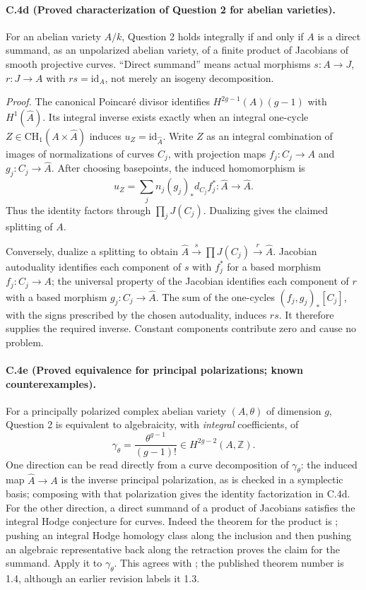 \paragraph{C.4d (Proved characterization of Question 2 for abelian varieties).}
For an abelian variety $A/k$, Question 2 holds integrally if and only
if $A$ is a direct summand, as an unpolarized abelian variety, of a
finite product of Jacobians of smooth projective curves. ``Direct
summand'' means actual morphisms $s:A\to J$, $r:J\to A$ with
$rs=\mathrm{id}_A$, not merely an isogeny decomposition.

\emph{Proof.}
The canonical Poincar\'e divisor identifies
$H^{2g-1}(A)(g-1)$ with $H^1(\widehat A)$. Its integral inverse exists
exactly when an integral one-cycle
$Z\in\mathrm{CH}_1(A\times\widehat A)$ induces
$u_Z=\mathrm{id}_{\widehat A}$. Write $Z$ as an integral combination
of images of normalizations of curves $C_j$, with projection maps
$f_j:C_j\to A$ and $g_j:C_j\to\widehat A$. After choosing basepoints,
the induced homomorphism is
\[
 u_Z=\sum_j n_j(g_j)_*d_{C_j}f_j^*:
 \widehat A\longrightarrow\widehat A.
\]
Thus the identity factors through $\prod_j J(C_j)$. Dualizing gives
the claimed splitting of $A$.

Conversely, dualize a splitting to obtain
$\widehat A\xrightarrow{s}\prod J(C_j)\xrightarrow{r}\widehat A$.
Jacobian autoduality identifies each component of $s$ with $f_j^*$
for a based morphism $f_j:C_j\to A$; the universal property of the
Jacobian identifies each component of $r$ with a based morphism
$g_j:C_j\to\widehat A$. The sum of the one-cycles
$(f_j,g_j)_*[C_j]$, with the signs prescribed by the chosen autoduality,
induces $rs$. It therefore supplies the required inverse. Constant
components contribute zero and cause no problem.

\paragraph{C.4e (Proved equivalence for principal polarizations; known counterexamples).}
For a principally polarized complex abelian variety $(A,\theta)$ of
dimension $g$, Question 2 is equivalent to algebraicity, with
\emph{integral} coefficients, of
\[
 \gamma_\theta=\frac{\theta^{g-1}}{(g-1)!}
 \in H^{2g-2}(A,\mathbb Z).
\]
One direction can be read directly from a curve decomposition of
$\gamma_\theta$: the induced map $\widehat A\to A$ is the inverse
principal polarization, as is checked in a symplectic basis; composing
with that polarization gives the identity factorization in C.4d.
For the other direction, a direct summand of a product of Jacobians
satisfies the integral Hodge conjecture for curves. Indeed the theorem
for the product is \citet[Theorem 1.2]{cyBeckmannFortman2023}; pushing
an integral Hodge homology class along the inclusion and then pushing
an algebraic representative back along the retraction proves the
claim for the summand. Apply it to $\gamma_\theta$.
This agrees with \citet[Theorem 1.4, Proposition 2.1,
Corollary 2.5]{cyVoisin2024}; the published theorem number is 1.4,
although an earlier revision labels it 1.3.

